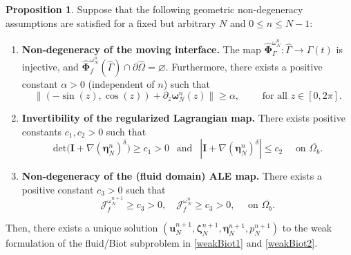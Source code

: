 \documentclass[11pt]{article}
\newcommand{\bd}{\boldsymbol}
\theoremstyle{definition}
\newtheorem{proposition}{Proposition}[section]
\begin{document}
\begin{proposition}\label{coercivegeometry}
Suppose that the following geometric non-degeneracy assumptions are satisfied for a fixed but arbitrary $N$ and $0 \le n \le N - 1$:
\begin{enumerate}
\item \textbf{Non-degeneracy of the moving interface.} The map $\hat{\bd{\Phi}}^{\omega^{n}_{N}}_{\Gamma}: \hat{\Gamma} \to \Gamma(t)$ is injective, and $\hat{\bd{\Phi}}_{f}^{\omega^{n}_{N}}(\hat{\Gamma}) \cap \partial \hat{\Omega} = \varnothing$. Furthermore, there exists a positive constant $\alpha > 0$ (independent of $n$) such that
\begin{equation*}
\|(-\sin(z), \cos(z)) + \partial_{z} \bd{\omega}^{n}_{N}(z)\| \ge \alpha, \qquad \text{ for all } z \in [0, 2\pi].
\end{equation*}
\item \textbf{Invertibility of the regularized Lagrangian map.} There exists positive constants $c_{1}, c_{2} > 0$ such that
\begin{equation*}
\text{det}\Big(\bd{I} + \nabla(\bd{\eta}^{n}_{N})^{\delta}\Big) \ge c_{1} > 0 \ \ \text{ and } \ \ |\bd{I} + \nabla (\bd{\eta}^{n}_{N})^{\delta}| \le c_{2} \quad \text{ on } \overline{\Omega_{b}}.
\end{equation*}
\item \textbf{Non-degeneracy of the (fluid domain) ALE map.} There exists a positive constant $c_{3} > 0$ such that
\begin{equation*}
\mathcal{J}^{\omega^{n + 1}_{N}}_{f} \ge c_{3} > 0, \quad \mathcal{J}^{\omega^{n}_{N}}_{f} \ge c_{3} > 0, \quad \text{ on } \overline{\Omega_{b}}.
\end{equation*}
\end{enumerate}
Then, there exists a unique solution $(\bd{u}^{n + 1}_{N}, \bd{\zeta}^{n + 1}_{N}, \bd{\eta}^{n + 1}_{N}, p^{n + 1}_{N})$ to the weak formulation of the fluid/Biot subproblem in \eqref{weakBiot1} and \eqref{weakBiot2}.
\end{proposition}
\end{document}
